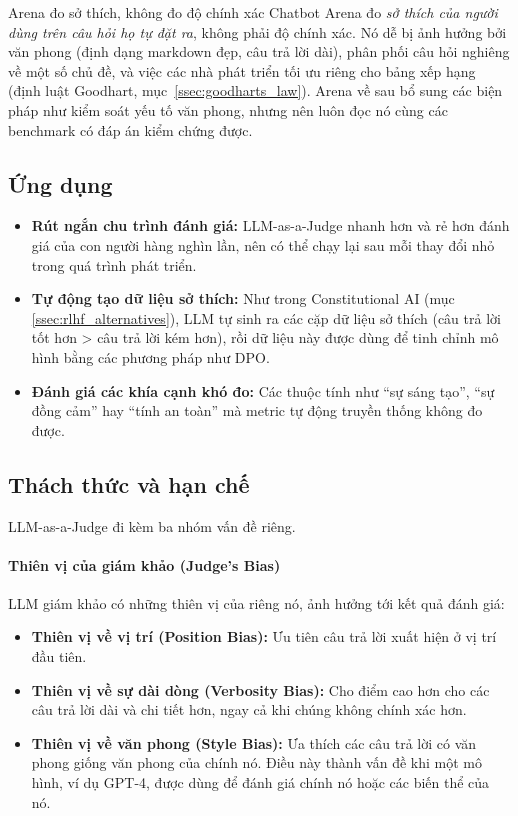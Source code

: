 \begin{pitfall}{Arena đo sở thích, không đo độ chính xác}
Chatbot Arena đo \emph{sở thích của người dùng trên câu hỏi họ tự đặt ra}, không phải độ chính xác. Nó dễ bị ảnh hưởng bởi văn phong (định dạng markdown đẹp, câu trả lời dài), phân phối câu hỏi nghiêng về một số chủ đề, và việc các nhà phát triển tối ưu riêng cho bảng xếp hạng (định luật Goodhart, mục~\ref{ssec:goodharts_law}). Arena về sau bổ sung các biện pháp như kiểm soát yếu tố văn phong, nhưng nên luôn đọc nó cùng các benchmark có đáp án kiểm chứng được.
\end{pitfall}

\subsection{Ứng dụng}
\label{ssec:llm_judge_applications}

\begin{itemize}
    \item \textbf{Rút ngắn chu trình đánh giá:} LLM-as-a-Judge nhanh hơn và rẻ hơn đánh giá của con người hàng nghìn lần, nên có thể chạy lại sau mỗi thay đổi nhỏ trong quá trình phát triển.
    \item \textbf{Tự động tạo dữ liệu sở thích:} Như trong Constitutional AI (mục \ref{ssec:rlhf_alternatives}), LLM tự sinh ra các cặp dữ liệu sở thích (câu trả lời tốt hơn > câu trả lời kém hơn), rồi dữ liệu này được dùng để tinh chỉnh mô hình bằng các phương pháp như DPO.
    \item \textbf{Đánh giá các khía cạnh khó đo:} Các thuộc tính như “sự sáng tạo”, “sự đồng cảm” hay “tính an toàn” mà metric tự động truyền thống không đo được.
\end{itemize}

\subsection{Thách thức và hạn chế}
\label{ssec:llm_judge_challenges}
LLM-as-a-Judge đi kèm ba nhóm vấn đề riêng.

\paragraph{Thiên vị của giám khảo (Judge's Bias)}
LLM giám khảo có những thiên vị của riêng nó, ảnh hưởng tới kết quả đánh giá:
\begin{itemize}
    \item \textbf{Thiên vị về vị trí (Position Bias):} Ưu tiên câu trả lời xuất hiện ở vị trí đầu tiên.
    \item \textbf{Thiên vị về sự dài dòng (Verbosity Bias):} Cho điểm cao hơn cho các câu trả lời dài và chi tiết hơn, ngay cả khi chúng không chính xác hơn.
    \item \textbf{Thiên vị về văn phong (Style Bias):} Ưa thích các câu trả lời có văn phong giống văn phong của chính nó. Điều này thành vấn đề khi một mô hình, ví dụ GPT-4, được dùng để đánh giá chính nó hoặc các biến thể của nó.
\end{itemize}

